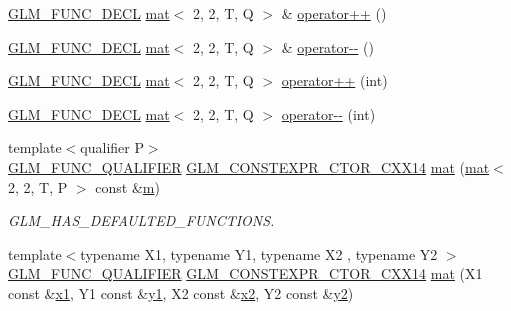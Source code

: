 \begin{DoxyCompactItemize}
\item 
\hyperlink{setup_8hpp_ab2d052de21a70539923e9bcbf6e83a51}{G\+L\+M\+\_\+\+F\+U\+N\+C\+\_\+\+D\+E\+CL} \hyperlink{structglm_1_1mat}{mat}$<$ 2, 2, T, Q $>$ \& \hyperlink{structglm_1_1mat_3_012_00_012_00_01_t_00_01_q_01_4_a3ba78b4e4d01ba944fab26b8286acac4}{operator++} ()
\item 
\hyperlink{setup_8hpp_ab2d052de21a70539923e9bcbf6e83a51}{G\+L\+M\+\_\+\+F\+U\+N\+C\+\_\+\+D\+E\+CL} \hyperlink{structglm_1_1mat}{mat}$<$ 2, 2, T, Q $>$ \& \hyperlink{structglm_1_1mat_3_012_00_012_00_01_t_00_01_q_01_4_a5ce05a8b04a45281df148d4b9a0bd5dc}{operator-\/-\/} ()
\item 
\hyperlink{setup_8hpp_ab2d052de21a70539923e9bcbf6e83a51}{G\+L\+M\+\_\+\+F\+U\+N\+C\+\_\+\+D\+E\+CL} \hyperlink{structglm_1_1mat}{mat}$<$ 2, 2, T, Q $>$ \hyperlink{structglm_1_1mat_3_012_00_012_00_01_t_00_01_q_01_4_a35434d16d35db785027c0d3b8b9c78b7}{operator++} (int)
\item 
\hyperlink{setup_8hpp_ab2d052de21a70539923e9bcbf6e83a51}{G\+L\+M\+\_\+\+F\+U\+N\+C\+\_\+\+D\+E\+CL} \hyperlink{structglm_1_1mat}{mat}$<$ 2, 2, T, Q $>$ \hyperlink{structglm_1_1mat_3_012_00_012_00_01_t_00_01_q_01_4_a281b447bee6e5873f04b693d7178da91}{operator-\/-\/} (int)
\item 
{\footnotesize template$<$qualifier P$>$ }\\\hyperlink{setup_8hpp_a33fdea6f91c5f834105f7415e2a64407}{G\+L\+M\+\_\+\+F\+U\+N\+C\+\_\+\+Q\+U\+A\+L\+I\+F\+I\+ER} \hyperlink{setup_8hpp_a0900f9145e68bf6061b6f5e7be3fa751}{G\+L\+M\+\_\+\+C\+O\+N\+S\+T\+E\+X\+P\+R\+\_\+\+C\+T\+O\+R\+\_\+\+C\+X\+X14} \hyperlink{structglm_1_1mat_3_012_00_012_00_01_t_00_01_q_01_4_a135dbb9a94e04066f09624c6f3ab3b53}{mat} (\hyperlink{structglm_1_1mat}{mat}$<$ 2, 2, T, P $>$ const \&\hyperlink{_s_d_l__opengl__glext_8h_af593500c283bf1a787a6f947f503a5c2}{m})
\begin{DoxyCompactList}\small\item\em G\+L\+M\+\_\+\+H\+A\+S\+\_\+\+D\+E\+F\+A\+U\+L\+T\+E\+D\+\_\+\+F\+U\+N\+C\+T\+I\+O\+NS. \end{DoxyCompactList}\item 
{\footnotesize template$<$typename X1, typename Y1, typename X2 , typename Y2 $>$ }\\\hyperlink{setup_8hpp_a33fdea6f91c5f834105f7415e2a64407}{G\+L\+M\+\_\+\+F\+U\+N\+C\+\_\+\+Q\+U\+A\+L\+I\+F\+I\+ER} \hyperlink{setup_8hpp_a0900f9145e68bf6061b6f5e7be3fa751}{G\+L\+M\+\_\+\+C\+O\+N\+S\+T\+E\+X\+P\+R\+\_\+\+C\+T\+O\+R\+\_\+\+C\+X\+X14} \hyperlink{structglm_1_1mat_3_012_00_012_00_01_t_00_01_q_01_4_a2648b2f4eae0dbdc87ebc1438ef45719}{mat} (X1 const \&\hyperlink{_s_d_l__opengl__glext_8h_a49825216c96caaeb09237b36651181c5}{x1}, Y1 const \&\hyperlink{_s_d_l__opengl__glext_8h_a3af6c78fcdfccea028a5878bc747ef39}{y1}, X2 const \&\hyperlink{_s_d_l__opengl__glext_8h_a7b907a03236685c534d89d604cff23c8}{x2}, Y2 const \&\hyperlink{_s_d_l__opengl__glext_8h_a2be1135ed68e8d80fa9e130c7814f8c2}{y2})

\end{DoxyCompactItemize}
